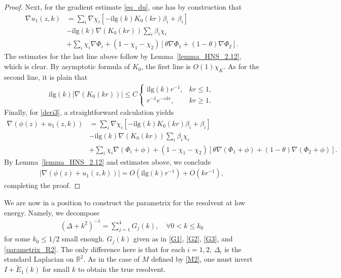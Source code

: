 \documentclass[12pt]{amsart}
\begin{document}
\begin{proof}
Next, for the gradient estimate \eqref{eq_du}, one has by construction that
\begin{align*}
    \nabla u_1(z,k) &= \sum_i \nabla \chi_i \left[ -\textrm{ilg}(k) K_0(kr) \beta_i + \beta_i \right]\\
    &- \textrm{ilg}(k) \nabla(K_0(kr)) \sum_i \beta_i \chi_i\\
    &+ \sum_i \chi_i \nabla \Phi_i + (1-\chi_1-\chi_2) \left[\theta \nabla\Phi_1 + (1-\theta) \nabla \Phi_2\right].
\end{align*}
The estimates for the last line above follow by Lemma~\ref{lemma_HNS_2.12}, which is clear. By asymptotic formula of $K_0$, the first line is $O(1)\chi_K$. As for the second line, it is plain that
\begin{align*}
    \textrm{ilg}(k)|\nabla (K_0(kr))|\le C \begin{cases}
        \textrm{ilg}(k) r^{-1}, & kr\le 1,\\
        r^{-1} e^{-ckr}, & kr\ge 1.
    \end{cases}
\end{align*}
Finally, for \eqref{deri3}, a straightforward calculation yields
\begin{align*}
    \nabla \left(\phi(z) + u_1(z,k)\right) &= \sum_i \nabla \chi_i \left[ -\textrm{ilg}(k) K_0(kr) \beta_i + \beta_i \right]\\
    &- \textrm{ilg}(k) \nabla(K_0(kr)) \sum_i \beta_i \chi_i\\
    &+ \sum_i \chi_i \nabla \left(\Phi_i + \phi \right) + (1-\chi_1-\chi_2) \left[\theta \nabla \left(\Phi_1+\phi \right) + (1-\theta) \nabla \left(\Phi_2+\phi\right)\right].
\end{align*}
By Lemma~\ref{lemma_HNS_2.12} and estimates above, we conclude
\begin{align*}
    |\nabla \left(\phi(z) + u_1(z,k)\right)| = O(\textrm{ilg}(k)r^{-1}) + O(kr^{-1}),
\end{align*}
completing the proof.

\end{proof}

We are now in a position to construct the parametrix for the resolvent at low energy. Namely, we decompose
\begin{align*}
    (\Delta+k^2)^{-1} = \sum_{j=1}^4 G_j(k),\quad \forall 0<k\le k_0
\end{align*}
for some $k_0\le 1/2$ small enough. $G_j(k)$ given as in \eqref{G1}, \eqref{G2}, \eqref{G3}, and \eqref{parametrix_R2}.  
The only difference here is that for each $i=1,2$, $\Delta_i$ is the standard Laplacian on $\mathbb{R}^2$. As in the case of $M$ defined by \eqref{M2}, one must invert $I+\tilde{E}_1(k)$ for small $k$ to obtain the true resolvent.
\end{document}

